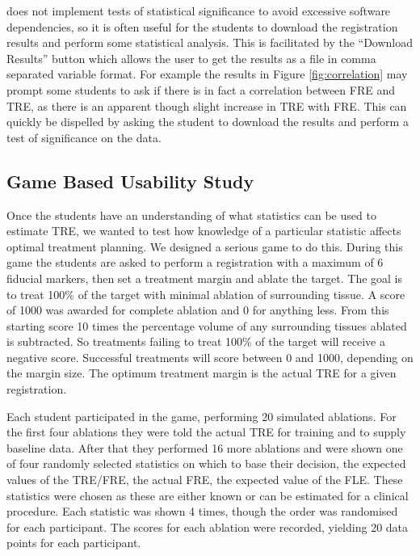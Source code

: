 \fred does not implement tests of statistical significance to avoid excessive software dependencies, so it is often 
useful for the students to download the registration results and perform some statistical analysis. This is facilitated by the 
``Download Results'' button which allows the user to get the results as a file in comma separated variable format. 
For example the results in Figure \ref{fig:correlation} may prompt some students to ask if there is in fact a correlation 
between \gls{FRE} and \gls{TRE}, as there is an apparent though slight increase in \gls{TRE} with \gls{FRE}. This can quickly 
be dispelled by asking the student to download the results and perform a test of significance on the data. 

\subsection{Game Based Usability Study}
\label{sec:game_method}
Once the students have an understanding of what statistics can be used to estimate \gls{TRE}, we wanted to test 
how knowledge of a particular statistic affects optimal treatment planning. We designed a serious game to 
do this. During this game the students are asked to perform a registration with a maximum of 
6 fiducial markers, then set a treatment margin and ablate the target. The goal is 
to treat 100\% of the target with minimal ablation of surrounding tissue.
A score of 1000 was awarded for complete ablation and 0 
for anything less. From this starting score 10 times the percentage volume of any
surrounding tissues ablated is subtracted. So 
treatments failing to treat 100\% of the target will receive a negative score. 
Successful treatments will score between 0 and 1000, depending on the margin size. The optimum treatment 
margin is the actual \gls{TRE} for a given registration.

Each student participated in the game, performing 20 simulated ablations. For the first four ablations they were told the 
actual \gls{TRE} for training and to supply baseline data. After that they performed 16 more ablations and were shown one of four randomly selected statistics on which to base their decision,
the expected values of the \gls{TRE}/\gls{FRE}, the actual \gls{FRE}, the expected value of the \gls{FLE}. These statistics
were chosen as these are either known or can be estimated for a clinical procedure. Each statistic was shown 4 times, though
the order was randomised for each participant. The scores for each ablation were recorded,  yielding 20 data points for 
each participant.

